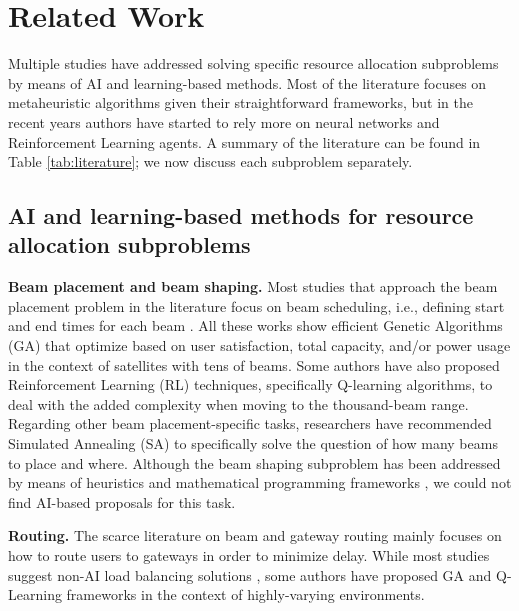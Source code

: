 \documentclass[letterpaper]{article} %
\begin{document}
\section{Related Work}


Multiple studies have addressed solving specific resource allocation subproblems by means of AI and learning-based methods. Most of the literature focuses on metaheuristic algorithms given their straightforward frameworks, but in the recent years authors have started to rely more on neural networks and Reinforcement Learning agents. A summary of the literature can be found in Table \ref{tab:literature}; we now discuss each subproblem separately.

\subsection{AI and learning-based methods for resource allocation subproblems}

\textbf{Beam placement and beam shaping.} Most studies that approach the beam placement problem in the literature focus on beam scheduling, i.e., defining start and end times for each beam \cite{wangdynamic, Deng2018, He2017, Anzalchi2010, Angeletti2006}. All these works show efficient Genetic Algorithms (GA) that optimize based on user satisfaction, total capacity, and/or power usage in the context of satellites with tens of beams. Some authors \cite{hu2020dynamic} have also proposed Reinforcement Learning (RL) techniques, specifically Q-learning algorithms, to deal with the added complexity when moving to the thousand-beam range. Regarding other beam placement-specific tasks, researchers have recommended Simulated Annealing (SA) \cite{Camino2014} to specifically solve the question of how many beams to place and where. Although the beam shaping subproblem has been addressed by means of heuristics and mathematical programming frameworks \cite{kyrgiazos2013irregular, camino2016mixed}, we could not find AI-based proposals for this task.


\textbf{Routing.} The scarce literature on beam and gateway routing mainly focuses on how to route users to gateways in order to minimize delay. While most studies suggest non-AI load balancing solutions \cite{torkzaban2020joint, yang2016towards}, some authors have proposed GA \cite{rao2011performance} and Q-Learning \cite{gong2020adaptive} frameworks in the context of highly-varying environments.
\end{document}
